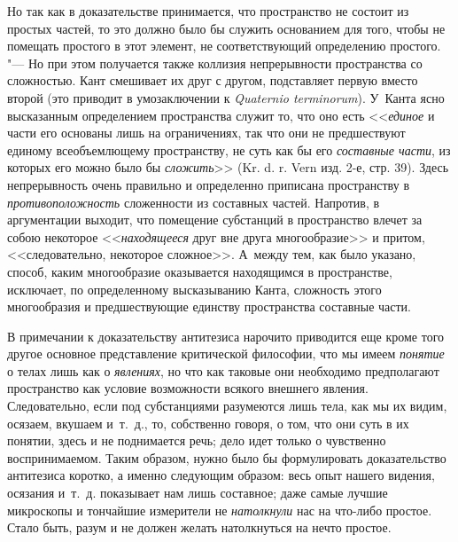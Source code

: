Но так как в доказательстве принимается, что пространство не состоит из
простых частей, то это должно было бы служить основанием для того, чтобы не
помещать простого в этот элемент, не соответствующий определению простого.
"--- Но при этом получается также коллизия непрерывности пространства со
сложностью. Кант смешивает их друг с другом, подставляет первую вместо
второй (это приводит в умозаключении к {\em Quaternio
terminorum}). У~Канта ясно высказанным определением пространства служит то,
что оно есть <<{\em единое} и части его основаны лишь на
ограничениях, так что они не предшествуют единому всеобъемлющему
пространству, не суть как бы его {\em составные части},
из которых его можно было бы {\em сложить}>> (Kr. d. r.
Vern изд. 2-е, стр. 39). Здесь непрерывность очень правильно и определенно
приписана пространству в {\em противоположность}
сложенности из составных частей. Напротив, в аргументации выходит, что
помещение субстанций в пространство влечет за собою некоторое
<<{\em находящееся} друг вне друга многообразие>> и
притом, <<следовательно, некоторое сложное>>. А~между тем, как было указано,
способ, каким многообразие оказывается находящимся в пространстве,
исключает, по определенному высказыванию Канта, сложность этого
многообразия и предшествующие единству пространства составные части.

В примечании к доказательству антитезиса нарочито приводится еще кроме того
другое основное представление критической философии, что мы имеем
{\em понятие} о телах лишь как о
{\em явлениях}, но что как таковые они необходимо
предполагают пространство как условие возможности всякого внешнего явления.
Следовательно, если под субстанциями разумеются лишь тела, как мы их видим,
осязаем, вкушаем и~т.~д., то, собственно говоря, о том, что они суть в их
понятии, здесь и не поднимается речь; дело идет только о чувственно
воспринимаемом. Таким образом, нужно было бы формулировать доказательство
антитезиса коротко, а именно следующим образом: весь опыт нашего видения,
осязания и~т.~д. показывает нам лишь составное; даже самые лучшие
микроскопы и тончайшие измерители не {\em натолкнули}
нас на что-либо простое. Стало быть, разум и не должен желать натолкнуться
на нечто простое.

